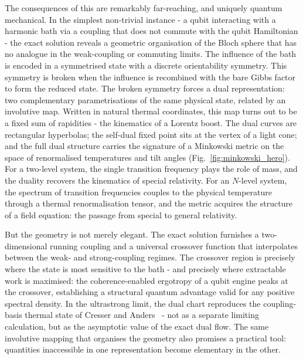 The consequences of this are remarkably far-reaching, and uniquely quantum mechanical. In the simplest
non-trivial instance - a qubit interacting with a harmonic bath via a
coupling that does not commute with the qubit Hamiltonian - the exact
solution reveals a geometric organisation of the Bloch sphere that has no
analogue in the weak-coupling or commuting limits. The influence of the bath is
encoded in a symmetrised state with a discrete orientability symmetry. This
symmetry is broken when the influence is recombined with the bare Gibbs factor
to form the reduced state. The broken symmetry forces a dual representation:
two complementary parametrisations of the same physical state, related by an
involutive map. Written in natural thermal coordinates, this map turns out to
be a fixed sum of rapidities - the kinematics of a Lorentz boost. The dual
curves are rectangular hyperbolas; the self-dual fixed point sits at the vertex
of a light cone; and the full dual structure carries the signature of a
Minkowski metric on the space of renormalised temperatures and tilt angles
(Fig.~\ref{fig:minkowski_hero}). For a two-level system, the single transition
frequency plays the role of mass, and the duality recovers the kinematics of
special relativity. For an $N$-level system, the spectrum of transition
frequencies couples to the physical temperature through a thermal
renormalisation tensor, and the metric acquires the structure of a field
equation: the passage from special to general relativity.



But the geometry is not merely elegant. The exact solution furnishes a
two-dimensional running coupling and a universal crossover function that
interpolates between the weak- and strong-coupling regimes. The crossover
region is precisely where the state is most sensitive to the bath - and
precisely where extractable work is maximised: the coherence-enabled ergotropy
of a qubit engine peaks at the crossover, establishing a structural quantum
advantage valid for any positive spectral density. In the ultrastrong limit,
the dual chart reproduces the coupling-basis thermal state of Cresser and
Anders~\cite{cresserWeakUltrastrongCoupling2021a,leggettDynamicsDissipativeTwostate1987} -
not as a separate limiting calculation, but as the asymptotic value of the
exact dual flow. The same involutive mapping that organises the geometry also
promises a practical tool: quantities inaccessible in one representation become
elementary in the other.

